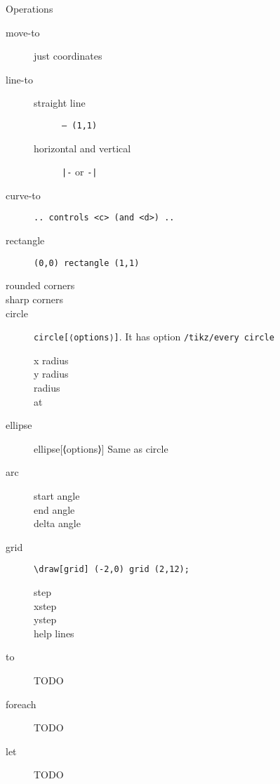 Operations
\begin{description}
\item [move-to] just coordinates
\item [line-to]
  \begin{description}
  \item [straight line] \texttt{-- (1,1)}
  \item [horizontal and vertical] \texttt{|-} or \texttt{-|}
  \end{description}
\item [curve-to] \texttt{.. controls <c> (and <d>) ..}
\item [rectangle] \texttt{(0,0) rectangle (1,1)}
\item [rounded corners]
\item [sharp corners]
\item [circle] \texttt{circle[⟨options⟩]}. It has option
  \texttt{/tikz/every circle}
  \begin{description}
  \item [x radius]
  \item [y radius]
  \item [radius]
  \item [at]
  \end{description}
\item [ellipse] ellipse[⟨options⟩] Same as circle
\item [arc]
  \begin{description}
  \item [start angle]
  \item [end angle]
  \item [delta angle]
  \end{description}
\item [grid] \verb$\draw[grid] (-2,0) grid (2,12);$
  \begin{description}
  \item [step]
  \item [xstep]
  \item [ystep]
  \item [help lines]
  \end{description}
\item [to] TODO
\item [foreach] TODO
\item [let] TODO
\end{description}

